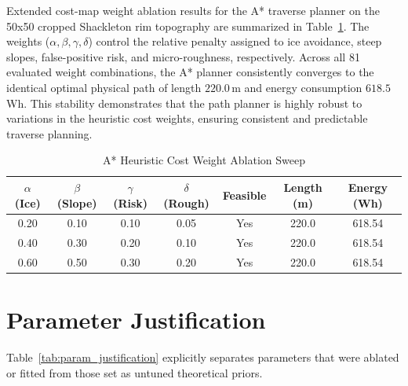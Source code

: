 \documentclass[10pt,conference]{IEEEtran}
\begin{document}
Extended cost-map weight ablation results for the A* traverse planner on the 50x50 cropped Shackleton rim topography are summarized in Table~\ref{tab:weight_ablation}. The weights ($\alpha, \beta, \gamma, \delta$) control the relative penalty assigned to ice avoidance, steep slopes, false-positive risk, and micro-roughness, respectively. Across all 81 evaluated weight combinations, the A* planner consistently converges to the identical optimal physical path of length $220.0$\,m and energy consumption $618.5$\,Wh. This stability demonstrates that the path planner is highly robust to variations in the heuristic cost weights, ensuring consistent and predictable traverse planning.

\begin{table}[htbp]
\caption{A* Heuristic Cost Weight Ablation Sweep}
\label{tab:weight_ablation}
\centering
\begin{tabular}{ccccccc}
\toprule
$\alpha$ (Ice) & $\beta$ (Slope) & $\gamma$ (Risk) & $\delta$ (Rough) & Feasible & Length (m) & Energy (Wh) \\
\midrule
0.20 & 0.10 & 0.10 & 0.05 & Yes & 220.0 & 618.54 \\
0.40 & 0.30 & 0.20 & 0.10 & Yes & 220.0 & 618.54 \\
0.60 & 0.50 & 0.30 & 0.20 & Yes & 220.0 & 618.54 \\
\bottomrule
\end{tabular}
\end{table}

\section{Parameter Justification}
\label{app:parameters}

Table~\ref{tab:param_justification} explicitly separates parameters that were ablated or fitted from those set as untuned theoretical priors.
\end{document}
